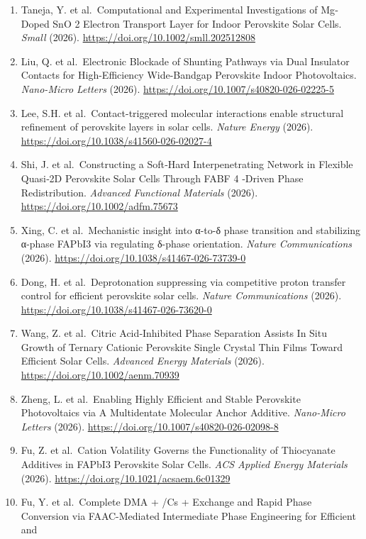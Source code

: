 \documentclass[
  11pt,
]{article}
\begin{document}
\begin{enumerate}
\item
  Taneja, Y. et al.~Computational and Experimental Investigations of
  Mg‐Doped SnO 2 Electron Transport Layer for Indoor Perovskite Solar
  Cells. \emph{Small} (2026).
  \url{https://doi.org/10.1002/smll.202512808}
\item
  Liu, Q. et al.~Electronic Blockade of Shunting Pathways via Dual
  Insulator Contacts for High-Efficiency Wide-Bandgap Perovskite Indoor
  Photovoltaics. \emph{Nano-Micro Letters} (2026).
  \url{https://doi.org/10.1007/s40820-026-02225-5}
\item
  Lee, S.H. et al.~Contact-triggered molecular interactions enable
  structural refinement of perovskite layers in solar cells.
  \emph{Nature Energy} (2026).
  \url{https://doi.org/10.1038/s41560-026-02027-4}
\item
  Shi, J. et al.~Constructing a Soft‐Hard Interpenetrating Network in
  Flexible Quasi‐2D Perovskite Solar Cells Through FABF 4 ‐Driven Phase
  Redistribution. \emph{Advanced Functional Materials} (2026).
  \url{https://doi.org/10.1002/adfm.75673}
\item
  Xing, C. et al.~Mechanistic insight into α-to-δ phase transition and
  stabilizing α-phase FAPbI3 via regulating δ-phase orientation.
  \emph{Nature Communications} (2026).
  \url{https://doi.org/10.1038/s41467-026-73739-0}
\item
  Dong, H. et al.~Deprotonation suppressing via competitive proton
  transfer control for efficient perovskite solar cells. \emph{Nature
  Communications} (2026).
  \url{https://doi.org/10.1038/s41467-026-73620-0}
\item
  Wang, Z. et al.~Citric Acid‐Inhibited Phase Separation Assists In Situ
  Growth of Ternary Cationic Perovskite Single Crystal Thin Films Toward
  Efficient Solar Cells. \emph{Advanced Energy Materials} (2026).
  \url{https://doi.org/10.1002/aenm.70939}
\item
  Zheng, L. et al.~Enabling Highly Efficient and Stable Perovskite
  Photovoltaics via A Multidentate Molecular Anchor Additive.
  \emph{Nano-Micro Letters} (2026).
  \url{https://doi.org/10.1007/s40820-026-02098-8}
\item
  Fu, Z. et al.~Cation Volatility Governs the Functionality of
  Thiocyanate Additives in FAPbI3 Perovskite Solar Cells. \emph{ACS
  Applied Energy Materials} (2026).
  \url{https://doi.org/10.1021/acsaem.6c01329}
\item
  Fu, Y. et al.~Complete DMA + /Cs + Exchange and Rapid Phase Conversion
  via FAAC-Mediated Intermediate Phase Engineering for Efficient and

\end{enumerate}
\end{document}
